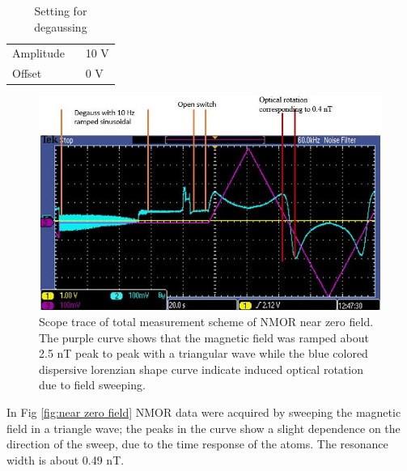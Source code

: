\begin{itemize}
\begin{table}[h]
\begin{tabular}{|l |l|}
Amplitude   &  ~ 10 V \\
Offset  &      ~ 0 V  \\
\hline
\end{tabular}
\caption{Setting for degaussing }
\end{table}
\begin{figure}[h]
 \centering\includegraphics[width=0.7\linewidth]{figures/scope_trace_of_field_sweeping}
 
\caption{Scope trace of total measurement scheme of NMOR near zero field. The purple curve shows that the magnetic field was ramped about 2.5 nT peak to peak with a triangular wave while the blue colored dispersive lorenzian shape curve indicate induced optical rotation due to field sweeping.\label{fig:TUNE} }
\end{figure}
\newpage
In Fig \ref{fig:near zero field}    NMOR data were acquired by sweeping the magnetic field in a triangle wave; the peaks in the curve show a slight dependence on the direction of the sweep, due to the time response of the atoms. The resonance width is about 0.49 nT.


\end{itemize}
